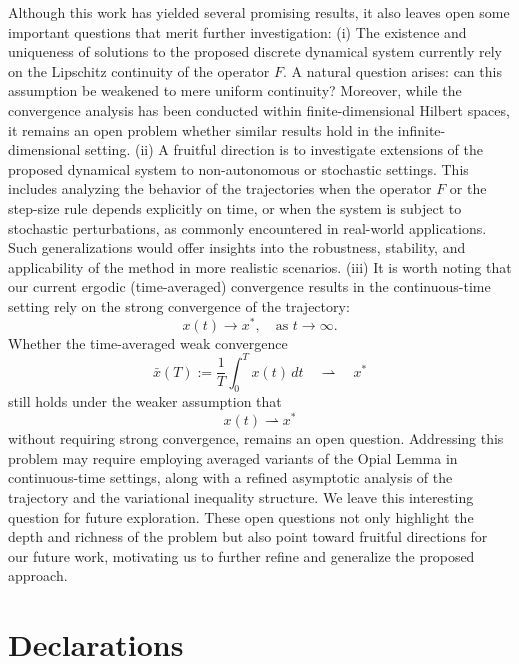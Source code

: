\documentclass[hidelinks,11 pt]{article}
\numberwithin{equation}{section}
\theoremstyle{definition}  %
\numberwithin{equation}{section}
\numberwithin{theorem}{section}
\begin{document}
\vskip 2mm 
Although this work has yielded several promising results, it also leaves open some important questions that merit further investigation:
\vskip 2mm
(i) The existence and uniqueness of solutions to the proposed discrete dynamical system currently rely on the Lipschitz continuity of the operator \( F \). A natural question arises: can this assumption be weakened to mere uniform continuity? Moreover, while the convergence analysis has been conducted within finite-dimensional Hilbert spaces, it remains an open problem whether similar results hold in the infinite-dimensional setting.
\vskip 2mm
(ii) A fruitful direction is to investigate extensions of the proposed dynamical system to non-autonomous or stochastic settings. This includes analyzing the behavior of the trajectories when the operator \( F \) or the step-size rule depends explicitly on time, or when the system is subject to stochastic perturbations, as commonly encountered in real-world applications. Such generalizations would offer insights into the robustness, stability, and applicability of the method in more realistic scenarios.
\vskip 2mm
(iii) It is worth noting that our current ergodic (time-averaged) convergence results in the continuous-time setting rely on the strong convergence of the trajectory:
\[
x(t) \to x^*, \quad \text{as } t \to \infty.
\]
Whether the time-averaged weak convergence
\[
\bar{x}(T) := \frac{1}{T} \int_0^T x(t)\,dt \quad \rightharpoonup \quad x^*
\]
still holds under the weaker assumption that
\[
x(t) \rightharpoonup x^*
\]
without requiring strong convergence, remains an open question. Addressing this problem may require employing averaged variants of the Opial Lemma in continuous-time settings, along with a refined asymptotic analysis of the trajectory and the variational inequality structure. We leave this interesting question for future exploration.
\vskip 2mm 
These open questions not only highlight the depth and richness of the problem but also point toward fruitful directions for our future work, motivating us to further refine and generalize the proposed approach.




















\section*{Declarations}
\end{document}
